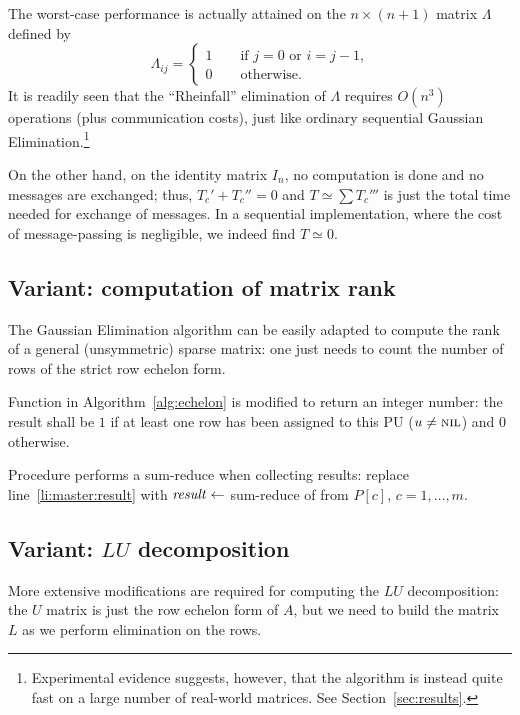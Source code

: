 The worst-case performance is actually attained on the $n \times
(n+1)$ matrix $\Lambda$ defined by
\begin{equation*}
  \Lambda_{ij} =
  \begin{cases}
    1  \qquad \text{if $j=0$ or $i = j-1$,}
    \\
    0  \qquad \text{otherwise.}
  \end{cases}
\end{equation*}
It is readily seen that the ``Rheinfall'' elimination of $\Lambda$
requires $O(n^3)$ operations (plus communication costs), just like
ordinary sequential Gaussian Elimination.\footnote{Experimental
  evidence suggests, however, that the algorithm is instead quite fast
  on a large number of real-world matrices. See
  Section~\ref{sec:results}.}

On the other hand, on the identity matrix $I_n$, no computation is
done and no  messages are exchanged; thus, $T_c' + T_c'' = 0$
and $T \simeq \sum T_c'''$ is just the total time needed for exchange
of  messages.  In a sequential implementation, where the cost
of message-passing is negligible, we indeed find $T \simeq 0$.


\subsection{Variant: computation of matrix rank}
\label{sec:rank}

The Gaussian Elimination algorithm can be easily adapted to compute
the rank of a general (unsymmetric) sparse matrix: one just needs to
count the number of rows of the strict row echelon form.

Function  in Algorithm~\ref{alg:echelon}
is modified to return an integer number: the result shall be $1$ if at
least one row has been assigned to this PU ($u \not= \textnormal{\scshape nil}$) and $0$
otherwise.

Procedure  performs a sum-reduce when collecting results:
replace line~\ref{li:master:result} with $\id{result} \gets$
sum-reduce of  from $P[c]$, $c=1, \ldots, m$.


\subsection{Variant: $LU$ decomposition}
\label{sec:lu}

More extensive modifications are required for computing the $LU$
decomposition: the $U$ matrix is just the row echelon form of $A$, but
we need to build the matrix $L$ as we perform elimination on the rows.

